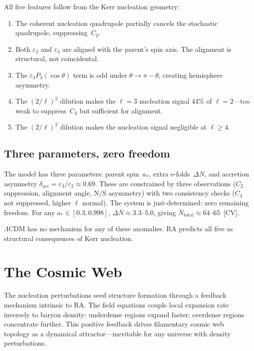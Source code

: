 \documentclass[11pt,a4paper]{article}
\theoremstyle{plain}
\theoremstyle{definition}
\theoremstyle{remark}
\begin{document}
All five features follow from the Kerr nucleation geometry:
\begin{enumerate}[nosep]
\item The coherent nucleation quadrupole partially cancels the stochastic
  quadrupole, suppressing~$C_2$.
\item Both $\varepsilon_2$ and $\varepsilon_3$ are aligned with the parent's spin
  axis.  The alignment is structural, not coincidental.
\item The $\varepsilon_3 P_3(\cos\theta)$ term is odd under
  $\theta \to \pi - \theta$, creating hemisphere asymmetry.
\item The $(2/\ell)^2$ dilution makes the $\ell = 3$ nucleation signal 44\% of
  $\ell = 2$---too weak to suppress~$C_3$ but sufficient for alignment.
\item The $(2/\ell)^2$ dilution makes the nucleation signal negligible at
  $\ell \geq 4$.
\end{enumerate}

\subsection{Three parameters, zero freedom}\label{sec:threeparam}

The model has three parameters: parent spin~$a_*$, extra e-folds~$\Delta N$, and
accretion asymmetry $\delta_{\mathrm{acc}} = \varepsilon_3/\varepsilon_2 \approx
0.69$.  These are constrained by three observations ($C_2$ suppression, alignment
angle, N/S asymmetry) with two consistency checks ($C_3$ not suppressed, higher
$\ell$ normal).  The system is just-determined: zero remaining freedom.  For any
$a_* \in [0.3, 0.998]$, $\Delta N \approx 3.3$--$5.0$, giving
$N_{\mathrm{total}} \approx 64$--$65$~[CV].

$\Lambda$CDM has no mechanism for any of these anomalies.  RA predicts all five as
structural consequences of Kerr nucleation.

\section{The Cosmic Web}\label{sec:web}

The nucleation perturbations seed structure formation through a feedback mechanism
intrinsic to RA.  The field equations couple local expansion rate inversely to
baryon density: underdense regions expand faster; overdense regions concentrate
further.  This positive feedback drives filamentary cosmic web topology as a
dynamical attractor---inevitable for any universe with density perturbations.
\end{document}

